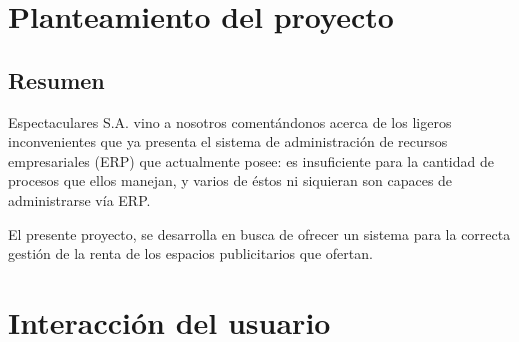 \documentclass[12pt]{article}
\begin{document}
\newpage
{}
\tableofcontents
\newpage
{}
\section{Planteamiento del proyecto}
\subsection{Resumen}
Espectaculares S.A. vino a nosotros comentándonos acerca de los ligeros inconvenientes que ya presenta el sistema de administración de recursos empresariales (ERP) que actualmente posee: es insuficiente para la cantidad de procesos que ellos manejan, y varios de éstos ni siquieran son capaces de administrarse vía ERP.

El presente proyecto, se desarrolla en busca de ofrecer un sistema para la correcta gestión de la renta de los espacios publicitarios que ofertan.
\section{Interacción del usuario}
\end{document}
